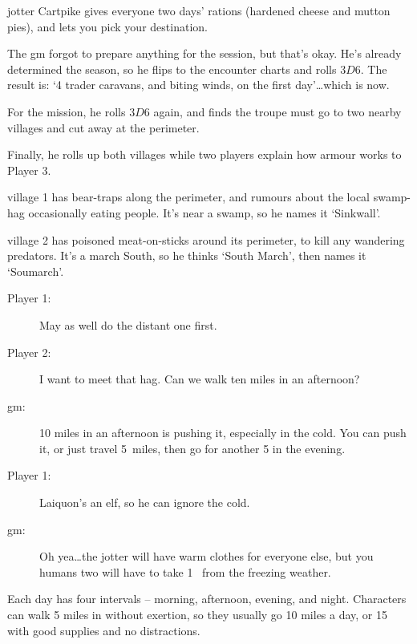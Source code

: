 \begin{multicols}{3}
\begin{description}
  \Gls{jotter} Cartpike gives everyone two days' rations (hardened cheese and mutton pies), and lets you pick your destination.
\end{description}

\bigLine
\vspace{\baselineskip}

The \gls{gm} forgot to prepare anything for the session, but that's okay.
He's already determined the season, so he flips to the encounter charts and rolls $3D6$.
The result is: `4 trader caravans, and biting winds, on the first day'\ldots which is now.

For the mission, he rolls $3D6$ again, and finds the troupe must go to two nearby \glspl{village} and cut away at the perimeter.

Finally, he rolls up both \glspl{village} while two players explain how armour works to Player 3.

\Gls{village} 1 has bear-traps along the perimeter, and rumours about the local swamp-hag occasionally eating people.
It's near a swamp, so he names it `Sinkwall'.

\Gls{village} 2 has poisoned meat-on-sticks around its perimeter, to kill any wandering predators.
It's a march South, so he thinks `South March', then names it `Soumarch'.


\begin{description}
  \item[Player 1:]
  May as well do the distant one first.
  \item[Player 2:]
  I want to meet that hag.
  Can we walk ten miles in an afternoon?
  \item[\gls{gm}:]
  10 miles in an afternoon is pushing it, especially in the cold.
  You can push it, or just travel 5~miles, then go for another 5 in the evening.
  \item[Player 1:]
  Laiquon's an elf, so he can ignore the cold.
  \item[\gls{gm}:]
  Oh yea\ldots the \gls{jotter} will have warm clothes for everyone else, but you humans two will have to take 1~ from the freezing weather.
\end{description}

\bigLine
\vspace{\baselineskip}
Each day has four \glspl{interval} -- morning, afternoon, evening, and night.
Characters can walk 5 miles in  without exertion, so they usually go 10 miles a day, or 15 with good supplies and no distractions.


\end{multicols}
